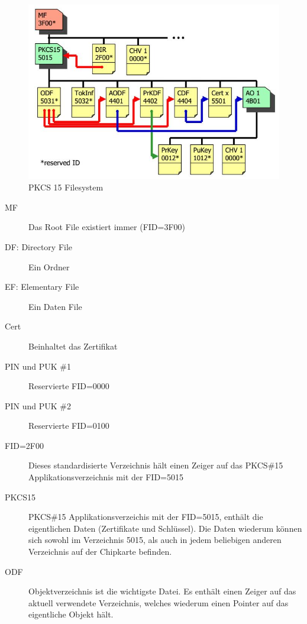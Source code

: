 \begin{figure}[h!]
	\centering
	\includegraphics[width=0.7\linewidth]{images/pkcs15}
	\caption{PKCS 15 Filesystem}
	\label{fig:pkcs15}
\end{figure}

\begin{description}
	\item[MF] Das Root File existiert immer (FID=3F00)
	\item[DF: Directory File] Ein Ordner
	\item[EF: Elementary File] Ein Daten File
	\item[Cert] Beinhaltet das Zertifikat
	\item[PIN und PUK \#1] Reservierte FID=0000
	\item[PIN und PUK \#2] Reservierte FID=0100
	\item[FID=2F00] Dieses standardisierte Verzeichnis hält einen Zeiger auf das PKCS\#15 Applikationsverzeichnis mit der FID=5015
	\item[PKCS15] PKCS\#15 Applikationsverzeichis mit der FID=5015, enthält die eigentlichen Daten (Zertifikate und Schlüssel). Die Daten wiederum können sich sowohl im Verzeichnis 5015, als auch in jedem beliebigen anderen Verzeichnis auf der Chipkarte befinden.
	\item[ODF] Objektverzeichnis ist die wichtigste Datei. Es enthält einen Zeiger auf das aktuell verwendete Verzeichnis, welches wiederum einen Pointer auf das eigentliche Objekt hält.
\end{description}

